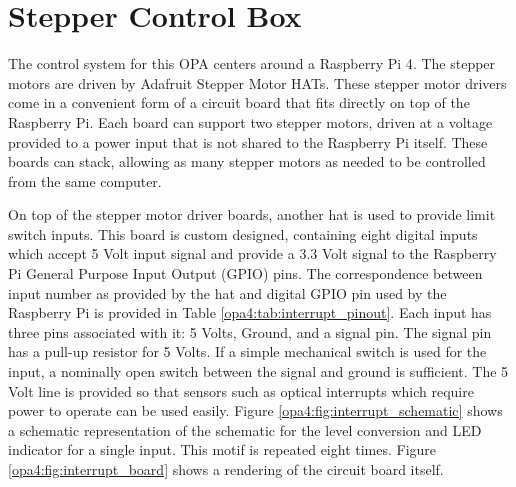 \section{Stepper Control Box}  %

The control system for this OPA centers around a Raspberry Pi 4\cite{}.
The stepper motors are driven by Adafruit Stepper Motor HATs\cite{}.
These stepper motor drivers come in a convenient form of a circuit board that fits directly on top of the Raspberry Pi.
Each board can support two stepper motors, driven at a voltage provided to a power input that is not shared to the Raspberry Pi itself.
These boards can stack, allowing as many stepper motors as needed to be controlled from the same computer.

On top of the stepper motor driver boards, another hat is used to provide limit switch inputs.
This board is custom designed, containing eight digital inputs which accept 5 Volt input signal and provide a 3.3 Volt signal to the Raspberry Pi General Purpose Input Output (GPIO) pins.
The correspondence between input number as provided by the hat and digital GPIO pin used by the Raspberry Pi is provided in Table \ref{opa4:tab:interrupt_pinout}.
Each input has three pins associated with it: 5 Volts, Ground, and a signal pin.
The signal pin has a pull-up resistor for 5 Volts.
If a simple mechanical switch is used for the input, a nominally open switch between the signal and ground is sufficient.
The 5 Volt line is provided so that sensors such as optical interrupts which require power to operate can be used easily.
Figure \ref{opa4:fig:interrupt_schematic} shows a schematic representation of the schematic for the level conversion and LED indicator for a single input.
This motif is repeated eight times.
Figure \ref{opa4:fig:interrupt_board} shows a rendering of the circuit board itself.

